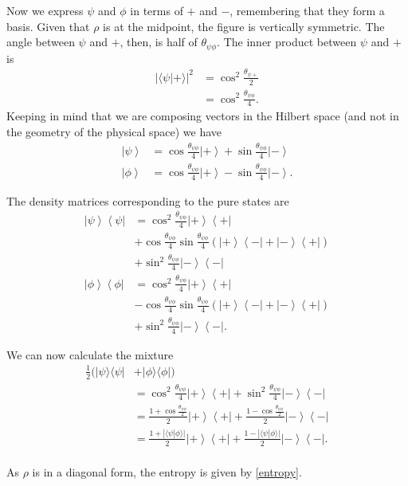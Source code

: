 \documentclass[10pt,twocolumn, nofootinbib]{revtex4-2}
\begin{document}
Now we express $\psi$ and $\phi$ in terms of $+$ and $-$, remembering that they form a basis. Given that $\rho$ is at the midpoint, the figure is vertically symmetric. The angle between $\psi$ and $+$, then, is half of $\theta_{\psi\phi}$. The inner product between $\psi$ and $+$ is
\begin{equation}
	\begin{aligned}
		|\langle \psi | + \rangle |^2 &= \cos^2 \frac{\theta_{\psi +}}{2} \\
		&= \cos^2 \frac{\theta_{\psi\phi}}{4}.
	\end{aligned}
\end{equation}
Keeping in mind that we are composing vectors in the Hilbert space (and not in the geometry of the physical space) we have
\begin{align*}
	\left|\psi\right>&=\cos\frac{\theta_{\psi\phi}}{4}\left|+\right>+\sin\frac{\theta_{\psi\phi}}{4}\left|-\right> \\
	\left|\phi\right>&=\cos\frac{\theta_{\psi\phi}}{4}\left|+\right>-\sin\frac{\theta_{\psi\phi}}{4}\left|-\right>.
\end{align*}

The density matrices corresponding to the pure states are
\begin{align*}
	\left|\psi\right>\left<\psi\right|&=\cos^2\frac{\theta_{\psi\phi}}{4}\left|+\right>\left<+\right|\\
	&+\cos\frac{\theta_{\psi\phi}}{4}\sin\frac{\theta_{\psi\phi}}{4}\left(\left|+\right>\left<-\right|+\left|-\right>\left<+\right|\right) \\
	&+\sin^2\frac{\theta_{\psi\phi}}{4}\left|-\right>\left<-\right| \\
	\left|\phi\right>\left<\phi\right|&=\cos^2\frac{\theta_{\psi\phi}}{4}\left|+\right>\left<+\right|\\
	&-\cos\frac{\theta_{\psi\phi}}{4}\sin\frac{\theta_{\psi\phi}}{4}\left(\left|+\right>\left<-\right|+\left|-\right>\left<+\right|\right) \\
	&+\sin^2\frac{\theta_{\psi\phi}}{4}\left|-\right>\left<-\right|.
\end{align*}

We can now calculate the mixture
\begin{align*}
	\frac{1}{2}(|\psi\rangle\langle\psi| &+ |\phi\rangle\langle\phi|) \\
	&=\cos^2\frac{\theta_{\psi\phi}}{4}\left|+\right>\left<+\right| +\sin^2\frac{\theta_{\psi\phi}}{4}\left|-\right>\left<-\right| \\
	&=\frac{1+\cos\frac{\theta_{\psi\phi}}{2}}{2}\left|+\right>\left<+\right| +\frac{1-\cos\frac{\theta_{\psi\phi}}{2}}{2}\left|-\right>\left<-\right| \\
	&=\frac{1+|\langle\psi|\phi\rangle|}{2}\left|+\right>\left<+\right| +\frac{1-|\langle\psi|\phi\rangle|}{2}\left|-\right>\left<-\right|. \\
\end{align*}

As $\rho$ is in a diagonal form, the entropy is given by \ref{entropy}.
\end{document}
